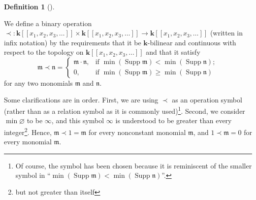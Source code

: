 \documentclass
[numbers=enddot,12pt,final,onecolumn,notitlepage,abstracton]{scrartcl}%
\theoremstyle{definition}
\newtheorem{defi}[theo]{Definition}
\newenvironment{definition}[1][]
{\begin{defi}[#1]\begin{leftbar}}
{\end{leftbar}\end{defi}}
\begin{document}
\begin{definition}
\label{def.Dless}We define a binary operation $\left.  \prec\right.
:\mathbf{k}\left[  \left[  x_{1},x_{2},x_{3},\ldots\right]  \right]
\times\mathbf{k}\left[  \left[  x_{1},x_{2},x_{3},\ldots\right]  \right]
\rightarrow\mathbf{k}\left[  \left[  x_{1},x_{2},x_{3},\ldots\right]  \right]
$ (written in infix notation\footnotemark) by the requirements that it be
$\mathbf{k}$-bilinear and continuous with respect to the topology on
$\mathbf{k}\left[  \left[  x_{1},x_{2},x_{3},\ldots\right]  \right]  $ and
that it satisfy%
\begin{equation}
\mathfrak{m}\left.  \prec\right.  \mathfrak{n}=
\begin{cases}
\mathfrak{m}\cdot\mathfrak{n}, & \text{if }\min\left(  \operatorname*{Supp}%
\mathfrak{m}\right)  <\min\left(  \operatorname*{Supp}\mathfrak{n}\right)  ;\\
0, & \text{if }\min\left(  \operatorname*{Supp}\mathfrak{m}\right)  \geq
\min\left(  \operatorname*{Supp}\mathfrak{n}\right)
\end{cases}
\label{eq.def.Dless.monomial}%
\end{equation}
for any two monomials $\mathfrak{m}$ and $\mathfrak{n}$.
\end{definition}

Some clarifications are in
order. First, we are using $\left.  \prec\right.  $ as an operation symbol
(rather than as a relation symbol as it is commonly used)\footnote{Of course,
the symbol has been chosen because it is reminiscent of the smaller symbol in
\textquotedblleft$\min\left(  \operatorname*{Supp}\mathfrak{m}\right)
<\min\left(  \operatorname*{Supp}\mathfrak{n}\right)  $\textquotedblright.}.
Second, we consider $\min\varnothing$ to be $\infty$, and this symbol $\infty$
is understood to be greater than every integer\footnote{but not greater than
itself}. Hence, $\mathfrak{m}\left.  \prec\right.  1=\mathfrak{m}$ for every
nonconstant monomial $\mathfrak{m}$, and $1\left.  \prec\right.
\mathfrak{m}=0$ for every monomial $\mathfrak{m}$.
\end{document}
